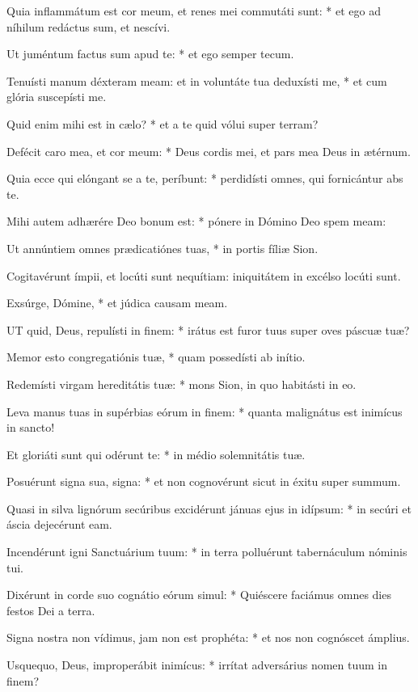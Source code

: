 Quia inflammátum est cor meum, et renes mei commutáti sunt: * et ego ad níhilum redáctus sum, et nescívi.

Ut juméntum factus sum apud te: * et ego semper tecum.

Tenuísti manum déxteram meam: et in voluntáte tua deduxísti me, * et cum glória suscepísti me.

Quid enim mihi est in cælo? * et a te quid vólui super terram?

Defécit caro mea, et cor meum: * Deus cordis mei, et pars mea Deus in ætérnum.

Quia ecce qui elóngant se a te, períbunt: * perdidísti omnes, qui fornicántur abs te.

Mihi autem adhærére Deo bonum est: * pónere in Dómino Deo spem meam:

Ut annúntiem omnes prædicatiónes tuas, * in portis fíliæ Sion.

\rubric{\textdagger}

 Cogitavérunt ímpii, et locúti sunt nequítiam: iniquitátem in excélso locúti sunt.

 Exsúrge, Dómine, * et júdica causam meam.


\lettrine[lines=2]{U}{T} quid, Deus, repulísti in finem: * irátus est furor tuus super oves páscuæ tuæ?

Memor esto congregatiónis tuæ, * quam possedísti ab inítio.

Redemísti virgam hereditátis tuæ: * mons Sion, in quo habitásti in eo.

Leva manus tuas in supérbias eórum in finem: * quanta malignátus est inimícus in sancto!

Et gloriáti sunt qui odérunt te: * in médio solemnitátis tuæ.

Posuérunt signa sua, signa: * et non cognovérunt sicut in éxitu super summum.

Quasi in silva lignórum secúribus excidérunt jánuas ejus in idípsum: * in secúri et áscia dejecérunt eam.

Incendérunt igni Sanctuárium tuum: * in terra polluérunt tabernáculum nóminis tui.

Dixérunt in corde suo cognátio eórum simul: * Quiéscere faciámus omnes dies festos Dei a terra.

Signa nostra non vídimus, jam non est prophéta: * et nos non cognóscet ámplius.

Usquequo, Deus, improperábit inimícus: * irrítat adversárius nomen tuum in finem?

